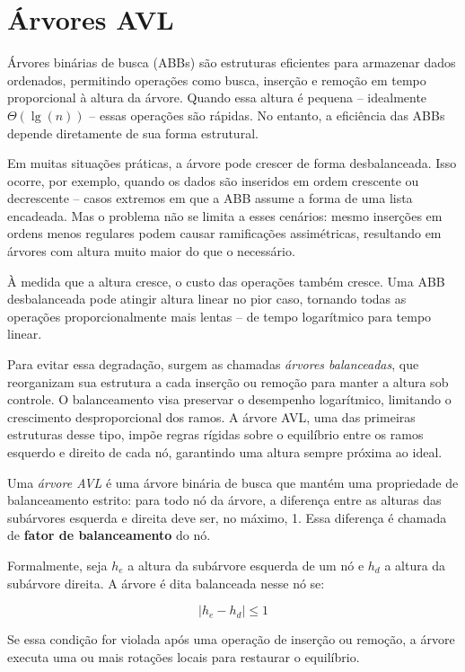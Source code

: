 \chapter{Árvores AVL}

Árvores binárias de busca (ABBs) são estruturas eficientes para armazenar dados ordenados, permitindo operações como busca, inserção e remoção em tempo proporcional à altura da árvore. 
Quando essa altura é pequena -- idealmente $\Theta(\lg(n))$ -- essas operações são rápidas. 
No entanto, a eficiência das ABBs depende diretamente de sua forma estrutural.

Em muitas situações práticas, a árvore pode crescer de forma desbalanceada. 
Isso ocorre, por exemplo, quando os dados são inseridos em ordem crescente ou decrescente -- casos extremos em que a ABB assume a forma de uma lista encadeada. 
Mas o problema não se limita a esses cenários: mesmo inserções em ordens menos regulares podem causar ramificações assimétricas, resultando em árvores com altura muito maior do que o necessário.

À medida que a altura cresce, o custo das operações também cresce. 
Uma ABB desbalanceada pode atingir altura linear no pior caso, tornando todas as operações proporcionalmente mais lentas -- de tempo logarítmico para tempo linear.

Para evitar essa degradação, surgem as chamadas \textit{árvores balanceadas}, que reorganizam sua estrutura a cada inserção ou remoção para manter a altura sob controle. O balanceamento visa preservar o desempenho logarítmico, limitando o crescimento desproporcional dos ramos. 
A árvore AVL, uma das primeiras estruturas desse tipo, impõe regras rígidas sobre o equilíbrio entre os ramos esquerdo e direito de cada nó, garantindo uma altura sempre próxima ao ideal.

Uma \textit{árvore AVL} é uma árvore binária de busca que mantém uma propriedade de balanceamento estrito: para todo nó da árvore, a diferença entre as alturas das subárvores esquerda e direita deve ser, no máximo, 1. 
Essa diferença é chamada de \textbf{fator de balanceamento} do nó.

Formalmente, seja $h_e$ a altura da subárvore esquerda de um nó e $h_d$ a altura da subárvore direita. 
A árvore é dita balanceada nesse nó se:

\[
|h_e - h_d| \leq 1
\]

Se essa condição for violada após uma operação de inserção ou remoção, a árvore executa uma ou mais rotações locais para restaurar o equilíbrio.

